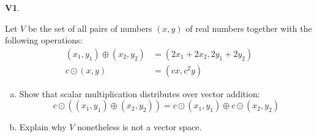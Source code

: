 \documentclass{article}
\newenvironment{problem}[1]
{
  \begin{flushleft}
  \textbf{#1}.
  \ignorespaces
}
{
  \end{flushleft}
}
\begin{document}
\begin{problem}{V1}
Let \(V\) be the set of all pairs of numbers \((x,y)\) of real numbers together with the following operations:
\begin{align*}
(x_1,y_1) \oplus (x_2,y_2) &= (2x_1+2x_2,2y_1+2y_2) \\
c\odot (x,y) &= (cx,c^2y)
\end{align*}
\begin{enumerate}[(a)]
\item Show that scalar multiplication distributes over vector addition:
\[c\odot \left((x_1,y_1) \oplus (x_2,y_2) \right) = c \odot (x_1,y_1) \oplus c \odot (x_2,y_2)\]
\item Explain why \(V\) nonetheless is not a vector space.
\end{enumerate}
\end{problem}
\end{document}
